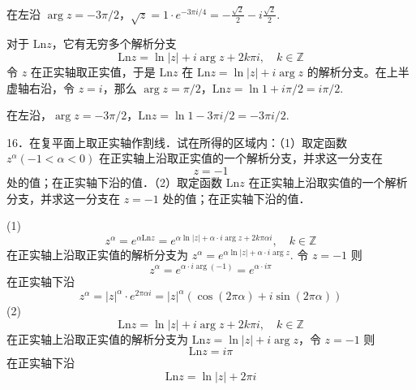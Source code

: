 在左沿 $\arg z=-3\pi/2$，$\sqrt{ z }=1\cdot e^{ -3\pi i/4  }=-\frac{\sqrt{ 2 }}{2}-i\frac{\sqrt{ 2 }}{2}$.

对于 $\mathrm{Ln}z$，它有无穷多个解析分支
\[
\mathrm{Ln}z=\ln\lvert z \rvert +i\arg z+2k\pi i,\quad k\in \mathbb{Z}
\]
令 $z$ 在正实轴取正实值，于是 $\mathrm{Ln}z$ 在 $\mathrm{Ln}z=\ln\lvert z \rvert+i\arg z$ 的解析分支。在上半虚轴右沿，令 $z=i$，那么 $\arg z=\pi/2$，$\mathrm{Ln}z=\ln1+i\pi/2=i\pi/2$.

在左沿，$\arg z=-3\pi/2$，$\mathrm{Ln}z=\ln1-3\pi i/2=-3\pi i/2$.

\begin{exercise}
16．在复平面上取正实轴作割线．试在所得的区域内：（1）取定函数 $z^\alpha(-1<\alpha<0)$ 在正实轴上沿取正实值的一个解析分支，并求这一分支在
\[
z=-1
\]处的值；在正实轴下沿的值．（2）取定函数 $\mathrm{Ln} z$ 在正实轴上沿取实值的一个解析分支，并求这一分支在 $z=-1$ 处的值；在正实轴下沿的值．
\end{exercise}
(1)
\[
z^{\alpha}=e^{ \alpha \mathrm{Ln}z }=e^{ \alpha \ln \lvert z \rvert +\alpha \cdot i\arg z+2k\pi\alpha i },\quad k\in \mathbb{Z}
\]
在正实轴上沿取正实值的解析分支为 $z^{\alpha}=e^{ \alpha \ln \lvert z \rvert+\alpha \cdot i\arg z }$. 令 $z=-1$ 则
\[
z^{\alpha}=e^{ \alpha \cdot i\arg(-1) }=e^{ \alpha \cdot i\pi  }
\]
在正实轴下沿
\[
z^{\alpha}=\lvert z \rvert ^{\alpha}\cdot e^{ 2\pi\alpha i }=\lvert z \rvert ^{\alpha}(\cos(2\pi\alpha)+i\sin(2\pi\alpha))
\]
(2)
\[
\mathrm{Ln}z=\ln \lvert z \rvert +i\arg z+2k\pi i,\quad k\in \mathbb{Z}
\]
在正实轴上沿取正实值的解析分支为 $\mathrm{Ln}z=\ln \lvert z \rvert+i\arg z$，令 $z=-1$ 则
\[
\mathrm{Ln}z=i\pi
\]
在正实轴下沿
\[
\mathrm{Ln}z=\ln \lvert z \rvert +2\pi i
\]